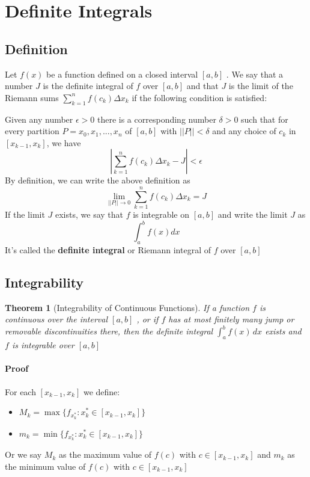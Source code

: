 \documentclass[12pt]{article}
\newtheorem{theorem}{Theorem}
\begin{document}
\section{Definite Integrals}
\subsection{Definition}
Let $f(x)$ be a function defined on a closed interval $[a, b]$ . We say
that a number $J$ is the definite integral of $f$ over $[a, b]$ and that $J$ is the limit of
the Riemann sums $\sum_{k = 1}^n f(c_k) \Delta x_k$ if the following condition is satisfied:

Given any number $\epsilon > 0$ there is a corresponding number $\delta > 0$ such that
for every partition $P = {x_0, x_1, ... , x_n}$ of $[a, b]$ with $||P|| < \delta $ and any choice
of $c_k$ in $[x_{k-1}, x_k]$, we have
\[
    \left|\sum_{k = 1}^n f(c_k) \Delta x_k - J \right| < \epsilon
\]
By definition, we can write the above definition as
\[
    \lim_{||P|| \to 0} \sum_{k = 1}^n f(c_k) \Delta x_k = J
\]
If the limit $J$ exists, we say that $f$ is integrable on $[a, b]$ and write the
limit $J$ as 
\[
    \int_{a}^{b} f(x) dx  
\]
It's called the \textbf{definite integral} or Riemann integral of $f$ over $[a, b]$
\subsection{Integrability}
\begin{theorem}[Integrability of Continuous Functions]
    If a function $f$ is continuous over the interval $[a, b]$ , or if $f$ has at most finitely many jump or removable discontinuities
    there, then the definite integral $\int_a^b f(x) \, dx$ exists and $f$ is integrable over $[a, b]$
\end{theorem}

\paragraph{Proof}
For each $[x_{k - 1}, x_k]$ we define:
\begin{itemize} 
    \item $M_k = \max\{f_{x_k^*} : x_k^* \in [x_{k - 1}, x_k]\}$
    \item $m_k = \min\{f_{x_k^*} : x_k^* \in [x_{k - 1}, x_k]\}$
\end{itemize}
Or we say $M_k$ as the maximum value of $f(c)$ with $c \in [x_{k - 1}, x_k]$ and
$m_k$ as the minimum value of $f(c)$ with $c \in [x_{k - 1}, x_k]$
\end{document}
